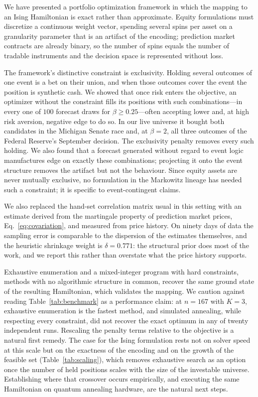 \documentclass[aps, reprint, prl, twocolumn, superscriptaddress,amsmath,amssymb,noeprint]{revtex4-2}
\begin{document}
We have presented a portfolio optimization framework in which the mapping to an
Ising Hamiltonian is exact rather than approximate.  Equity formulations must
discretize a continuous weight vector, spending several spins per asset on a
granularity parameter that is an artifact of the encoding; prediction market
contracts are already binary, so the number of spins equals the number of
tradable instruments and the decision space is represented without loss.

The framework's distinctive constraint is exclusivity.  Holding several
outcomes of one event is a bet on their union, and when those outcomes cover
the event the position is synthetic cash.  We showed that once risk enters the
objective, an optimizer without the constraint fills its positions with such
combinations---in every one of $100$ forecast draws for $\beta \ge 0.25$---often
accepting lower and, at high risk aversion, negative edge to do so.  In our live
universe it bought both candidates in the Michigan Senate race and, at
$\beta = 2$, all three outcomes of the Federal Reserve's September decision.
The exclusivity penalty removes every such holding.  We also found that a
forecast generated without regard to event logic manufactures edge on exactly
these combinations; projecting it onto the event structure removes the
artifact but not the behaviour.  Since equity assets are never mutually
exclusive, no formulation in the Markowitz lineage has needed such a
constraint; it is specific to event-contingent claims.

We also replaced the hand-set correlation matrix usual in this setting with an
estimate derived from the martingale property of prediction market prices,
Eq.~\eqref{eq:covariation}, and measured from price history.  On ninety
days of data the sampling error is comparable to the dispersion of the estimates
themselves, and the heuristic shrinkage weight is $\delta = 0.771$:
the structural prior does most of the work, and we report this rather than
overstate what the price history supports.

Exhaustive enumeration and a mixed-integer program with hard constraints,
methods with no algorithmic structure in common, recover the same ground state
of the resulting Hamiltonian, which validates the mapping.  We caution against
reading Table~\ref{tab:benchmark} as a performance claim: at $n=167$ with $K=3$,
exhaustive enumeration is the fastest method, and simulated annealing, while
respecting every constraint, did not recover the exact optimum in any of twenty
independent runs.  Rescaling the penalty terms relative to the objective is a
natural first remedy.  The case for the Ising formulation rests not
on solver speed at this scale but on the exactness of the encoding and on the
growth of the feasible set (Table~\ref{tab:scaling}), which removes exhaustive
search as an option once the number of held positions scales with the size of
the investable universe.  Establishing where that crossover occurs empirically,
and executing the same Hamiltonian on quantum annealing hardware, are the
natural next steps.
\end{document}

